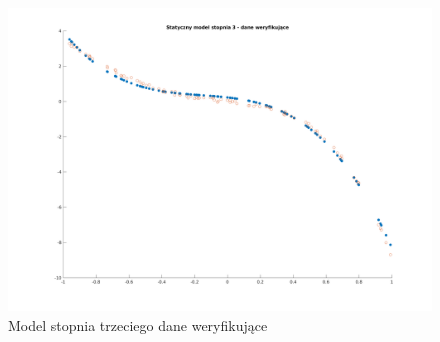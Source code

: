 \documentclass[a4paper, 11pt]{article}
\begin{document}
\begin{figure}[H]
\centering
\includegraphics[scale=0.50]{dane_stat_3_wer.png}
\caption{Model stopnia trzeciego dane weryfikujące}
\label{}
\end{figure}
\end{document}

